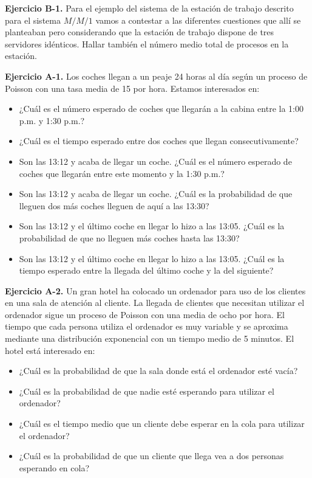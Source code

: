 \documentclass[
]{book}
\providecommand{\tightlist}{%
  \setlength{\itemsep}{0pt}\setlength{\parskip}{0pt}}
\theoremstyle{definition}
\theoremstyle{definition}
\theoremstyle{definition}
\theoremstyle{definition}
\theoremstyle{remark}
\begin{document}
\textbf{Ejercicio B-1.} Para el ejemplo del sistema de la estación de trabajo descrito para el sistema \(M/M/1\) vamos a contestar a las diferentes cuestiones que allí se planteaban pero considerando que la estación de trabajo dispone de tres servidores idénticos. Hallar también el número medio total de procesos en la estación.

\textbf{Ejercicio A-1.} Los coches llegan a un peaje 24 horas al día según un proceso de Poisson con
una tasa media de 15 por hora. Estamos interesados en:

\begin{itemize}
\tightlist
\item
  ¿Cuál es el número esperado de coches que llegarán a la cabina entre la 1:00 p.m. y 1:30 p.m.?
\item
  ¿Cuál es el tiempo esperado entre dos coches que llegan consecutivamente?
\item
  Son las 13:12 y acaba de llegar un coche. ¿Cuál es el número esperado de coches que llegarán entre este momento y la 1:30 p.m.?
\item
  Son las 13:12 y acaba de llegar un coche. ¿Cuál es la probabilidad de que lleguen dos más coches lleguen de aquí a las 13:30?
\item
  Son las 13:12 y el último coche en llegar lo hizo a las 13:05. ¿Cuál es la probabilidad de que no lleguen más coches hasta las 13:30?
\item
  Son las 13:12 y el último coche en llegar lo hizo a las 13:05. ¿Cuál es la tiempo esperado entre la llegada del último coche y la del siguiente?
\end{itemize}

\textbf{Ejercicio A-2.} Un gran hotel ha colocado un ordenador para uso de los clientes en una sala de atención al cliente. La llegada de clientes que necesitan utilizar el ordenador sigue un proceso de Poisson con una media de ocho por hora. El tiempo que cada persona utiliza el ordenador es muy variable y se aproxima mediante una distribución exponencial con un tiempo medio de 5 minutos. El hotel está interesado en:

\begin{itemize}
\tightlist
\item
  ¿Cuál es la probabilidad de que la sala donde está el ordenador esté vacía?
\item
  ¿Cuál es la probabilidad de que nadie esté esperando para utilizar el ordenador?
\item
  ¿Cuál es el tiempo medio que un cliente debe esperar en la cola para utilizar el ordenador?
\item
  ¿Cuál es la probabilidad de que un cliente que llega vea a dos personas esperando en cola?
\end{itemize}
\end{document}
